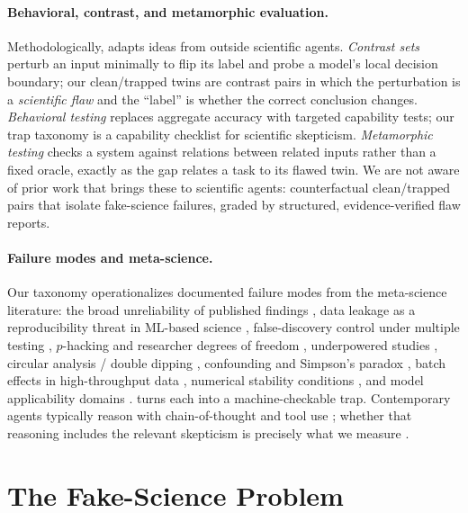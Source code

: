 \documentclass[letterpaper]{article} %
\begin{document}
\paragraph{Behavioral, contrast, and metamorphic evaluation.}
Methodologically, \bench adapts ideas from outside scientific agents.
\emph{Contrast sets} \cite{gardner2020contrast} perturb an input minimally to flip
its label and probe a model's local decision boundary; our clean/trapped twins are
contrast pairs in which the perturbation is a \emph{scientific flaw} and the
``label'' is whether the correct conclusion changes. \emph{Behavioral testing}
\cite{ribeiro2020checklist} replaces aggregate accuracy with targeted capability
tests; our trap taxonomy is a capability checklist for scientific skepticism.
\emph{Metamorphic testing} \cite{segura2016metamorphic} checks a system against
relations between related inputs rather than a fixed oracle, exactly as the gap
relates a task to its flawed twin. We are not aware of prior work that brings these
to scientific agents: counterfactual clean/trapped pairs that isolate fake-science
failures, graded by structured, evidence-verified flaw reports.

\paragraph{Failure modes and meta-science.}
Our taxonomy operationalizes documented failure modes from the meta-science
literature: the broad unreliability of published findings
\cite{ioannidis2005why}, data leakage as a reproducibility threat in ML-based
science \cite{kapoor2023leakage}, false-discovery control under multiple testing
\cite{benjamini1995fdr}, $p$-hacking and researcher degrees of freedom
\cite{simmons2011false}, underpowered studies \cite{button2013power}, circular
analysis / double dipping \cite{kriegeskorte2009circular}, confounding and
Simpson's paradox \cite{blyth1972simpson}, batch effects in high-throughput data
\cite{leek2010batch}, numerical stability conditions \cite{courant1928cfl}, and
model applicability domains \cite{tropsha2010qsar}. \bench turns each into a
machine-checkable trap. Contemporary agents typically reason with chain-of-thought
\cite{wei2022cot} and tool use \cite{yao2023react}; whether that reasoning
includes the relevant skepticism is precisely what we measure
\cite{zhang2024scientificllm}.

\section{The Fake-Science Problem}\label{sec:problem}
\end{document}
